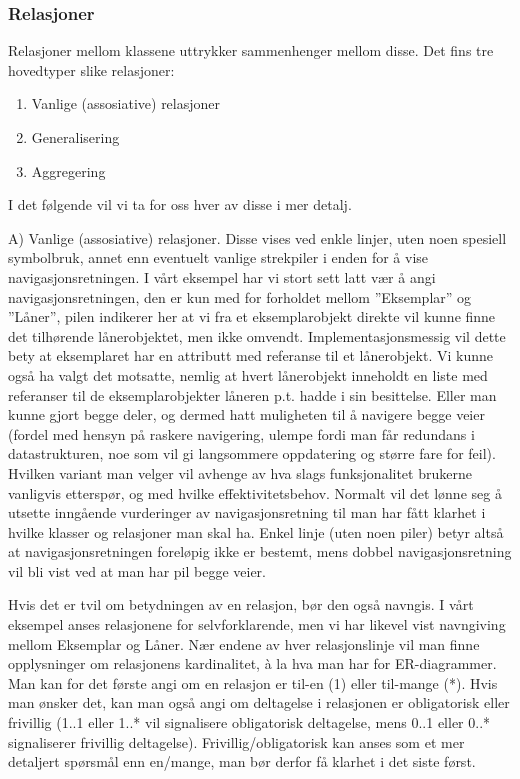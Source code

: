 \subsubsection{Relasjoner}

Relasjoner mellom klassene uttrykker sammenhenger mellom disse. Det fins tre hovedtyper slike relasjoner:

\begin{enumerate}

\item
Vanlige (assosiative) relasjoner

\item
Generalisering

\item
Aggregering

\end{enumerate}

I det følgende vil vi ta for oss hver av disse i mer detalj.

A) Vanlige (assosiative) relasjoner. Disse vises ved enkle linjer, uten noen spesiell symbolbruk, annet enn eventuelt vanlige strekpiler i enden for å vise navigasjonsretningen. I vårt eksempel har vi stort sett latt vær å angi navigasjonsretningen, den er kun med for forholdet mellom ”Eksemplar” og ”Låner”, pilen indikerer her at vi fra et eksemplarobjekt direkte vil kunne finne det tilhørende lånerobjektet, men ikke omvendt. Implementasjonsmessig vil dette bety at eksemplaret har en attributt med referanse til et lånerobjekt. Vi kunne også ha valgt det motsatte, nemlig at hvert lånerobjekt inneholdt en liste med referanser til de eksemplarobjekter låneren p.t. hadde i sin besittelse. Eller man kunne gjort begge deler, og dermed hatt muligheten til å navigere begge veier (fordel med hensyn på raskere navigering, ulempe fordi man får redundans i datastrukturen, noe som vil gi langsommere oppdatering og større fare for feil). Hvilken variant man velger vil avhenge av hva slags funksjonalitet brukerne vanligvis etterspør, og med hvilke effektivitetsbehov. Normalt vil det lønne seg å utsette inngående vurderinger av navigasjonsretning til man har fått klarhet i hvilke klasser og relasjoner man skal ha. Enkel linje (uten noen piler) betyr altså at navigasjonsretningen foreløpig ikke er bestemt, mens dobbel navigasjonsretning vil bli vist ved at man har pil begge veier.

Hvis det er tvil om betydningen av en relasjon, bør den også navngis. I vårt eksempel anses relasjonene for selvforklarende, men vi har likevel vist navngiving mellom Eksemplar og Låner. Nær endene av hver relasjonslinje vil man finne opplysninger om relasjonens kardinalitet, à la hva man har for ER-diagrammer. Man kan for det første angi om en relasjon er til-en (1) eller til-mange (*). Hvis man ønsker det, kan man også angi om deltagelse i relasjonen er obligatorisk eller frivillig (1..1 eller 1..* vil signalisere obligatorisk deltagelse, mens 0..1 eller 0..* signaliserer frivillig deltagelse). Frivillig/obligatorisk kan anses som et mer detaljert spørsmål enn en/mange, man bør derfor få klarhet i det siste først.


